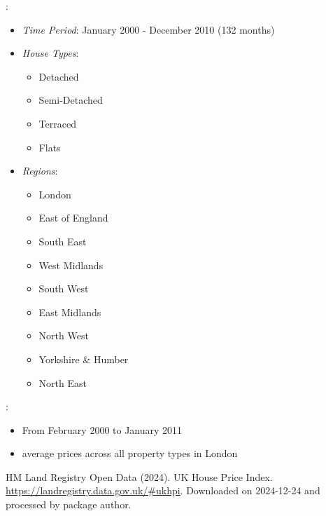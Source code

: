 \documentclass[a4paper]{book}
\begin{document}
%
\begin{Details}
:
\begin{itemize}

\item{} \emph{Time Period}: January 2000 - December 2010 (132 months)
\item{} \emph{House Types}:
\begin{itemize}

\item{} Detached
\item{} Semi-Detached
\item{} Terraced
\item{} Flats

\end{itemize}

\item{} \emph{Regions}:
\begin{itemize}

\item{} London
\item{} East of England
\item{} South East
\item{} West Midlands
\item{} South West
\item{} East Midlands
\item{} North West
\item{} Yorkshire \& Humber
\item{} North East

\end{itemize}


\end{itemize}


:
\begin{itemize}

\item{} From February 2000 to January 2011
\item{} average prices across all property types in London

\end{itemize}

\end{Details}
%
\begin{Source}
HM Land Registry Open Data (2024). UK House Price Index.
\url{https://landregistry.data.gov.uk/\#ukhpi}.
Downloaded on 2024-12-24 and processed by package author.
\end{Source}
%
\begin{Examples}
\end{Examples}
\end{document}
